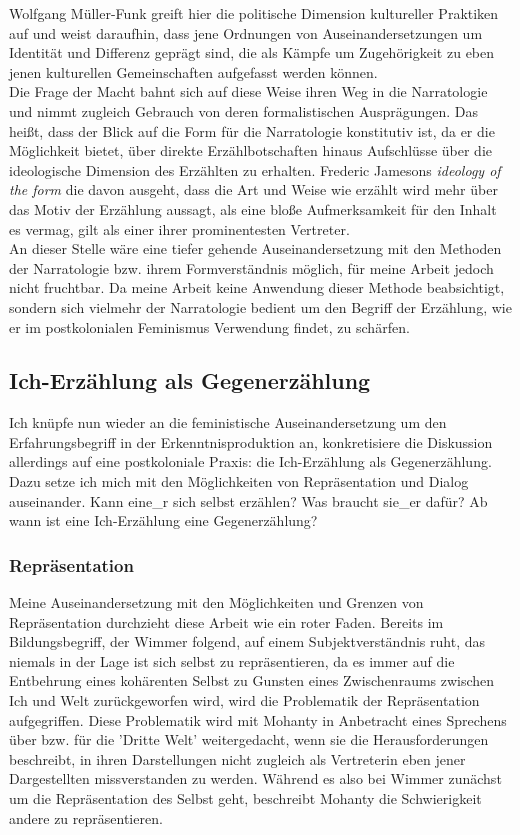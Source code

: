   Wolfgang Müller-Funk greift hier die politische Dimension kultureller
  Praktiken auf und weist daraufhin, dass jene Ordnungen von
  Auseinandersetzungen um Identität und Differenz geprägt sind, die als Kämpfe
  um Zugehörigkeit zu eben jenen kulturellen Gemeinschaften aufgefasst werden
  können. \\
  Die Frage der Macht bahnt sich auf diese Weise ihren Weg in die
  Narratologie und nimmt zugleich Gebrauch von deren formalistischen
  Ausprägungen. Das heißt, dass der Blick auf die Form für die Narratologie
  konstitutiv ist, da er die Möglichkeit bietet, über direkte Erzählbotschaften
  hinaus Aufschlüsse über die ideologische Dimension des Erzählten zu erhalten.
  Frederic Jamesons \textit{ideology of the form} die davon ausgeht, dass die Art und
  Weise wie erzählt wird mehr über das Motiv der Erzählung aussagt, als eine
  bloße Aufmerksamkeit für den Inhalt es vermag, gilt als einer ihrer
  prominentesten Vertreter.\\

  \noindent An dieser Stelle wäre eine tiefer gehende
  Auseinandersetzung mit den Methoden der Narratologie bzw. ihrem
  Formverständnis möglich, für meine Arbeit jedoch nicht fruchtbar. Da meine
  Arbeit keine Anwendung dieser Methode beabsichtigt, sondern sich vielmehr der
  Narratologie bedient um den Begriff der Erzählung, wie er im postkolonialen
  Feminismus Verwendung findet, zu schärfen.
\newpage
  \subsection{Ich-Erzählung als Gegenerzählung}

  Ich knüpfe nun wieder an die feministische Auseinandersetzung um den
  Erfahrungsbegriff in der Erkenntnisproduktion an, konkretisiere die
  Diskussion allerdings auf eine postkoloniale Praxis: die Ich-Erzählung als
  Gegenerzählung. Dazu setze ich mich mit den Möglichkeiten von Repräsentation
  und Dialog auseinander. Kann eine\_r sich selbst erzählen? Was braucht sie\_er
  dafür? Ab wann ist eine Ich-Erzählung eine Gegenerzählung?

  \subsubsection{Repräsentation}

  Meine Auseinandersetzung mit den Möglichkeiten und Grenzen von Repräsentation
  durchzieht diese Arbeit wie ein roter Faden. Bereits im Bildungsbegriff, der
  Wimmer folgend, auf einem Subjektverständnis ruht, das niemals in der Lage ist
  sich selbst zu repräsentieren, da es immer auf die Entbehrung eines
  kohärenten Selbst zu Gunsten eines Zwischenraums zwischen Ich und Welt
  zurückgeworfen wird, wird die Problematik der Repräsentation aufgegriffen.
  Diese Problematik wird mit  Mohanty in Anbetracht eines Sprechens über bzw.
  für die 'Dritte Welt' weitergedacht, wenn sie die Herausforderungen
  beschreibt, in ihren Darstellungen nicht zugleich als Vertreterin eben jener
  Dargestellten missverstanden zu werden. Während es also bei Wimmer zunächst
  um die Repräsentation des Selbst geht, beschreibt Mohanty die Schwierigkeit
  andere zu repräsentieren.\\
  
